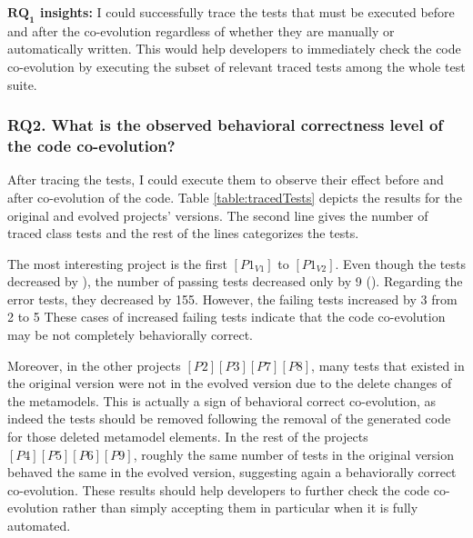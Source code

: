 \begin{tcolorbox}[boxsep=-2pt]
	\textbf{$\boldsymbol{RQ_1}$ insights:}
	I could successfully trace the tests that must be executed before and after the co-evolution regardless of whether they are manually or automatically written. This would help developers to immediately check the code co-evolution by executing the subset of relevant traced tests among the whole test suite. 
\end{tcolorbox}

\subsubsection{RQ2. What is the observed behavioral correctness level of the code co-evolution?}

After tracing the tests, I could execute them to observe their effect before and after co-evolution of the code. Table \ref{table:tracedTests} depicts the results for the original and evolved projects' versions. The second line gives the number of traced class tests and the rest of the lines categorizes the tests.  

The most interesting project is the first $[P1_{V1}]$ to $[P1_{V2}]$. Even though the tests decreased by ), the number of passing tests decreased only by 9 (). Regarding the error tests, they decreased by 155. However, the failing tests increased by 3 from 2 to 5 These cases of increased failing tests indicate that the code co-evolution may be not completely behaviorally correct. 

Moreover, in the other projects $[P2][P3][P7][P8]$, many tests that existed in the original version were not in the evolved version due to the delete changes of the metamodels. This is actually a sign of behavioral correct co-evolution, as indeed the tests should be removed following the removal of the generated code for those deleted metamodel elements. 
\red{}In the rest of the projects $[P4][P5][P6][P9]$, roughly the same number of tests in the original version behaved the same in the evolved version, suggesting again a behaviorally correct co-evolution.
These results should help developers to further check the code co-evolution rather than simply accepting them in particular when it is fully automated. 

